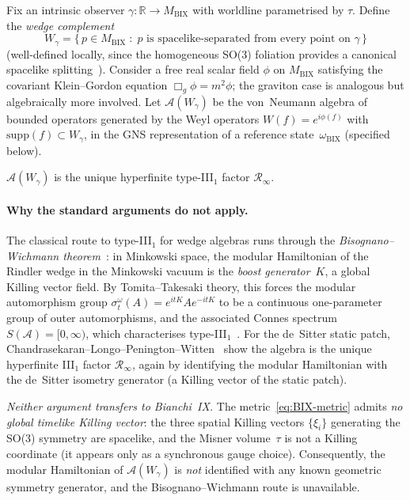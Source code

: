 Fix an intrinsic observer $\gamma:\mathbb{R}\to M_{\mathrm{BIX}}$
with worldline parametrised by $\tau$.
Define the \emph{wedge complement}
\begin{equation}
  W_\gamma = \{\,p\in M_{\mathrm{BIX}}\;:\;
     p \text{ is spacelike-separated from every point on }\gamma\,\}
\end{equation}
(well-defined locally, since the homogeneous SO(3) foliation provides a
canonical spacelike splitting~\cite{HeinzleUggla2009}).
Consider a free real scalar field $\phi$ on $M_{\mathrm{BIX}}$
satisfying the covariant Klein--Gordon equation $\Box_g\phi = m^2\phi$;
the graviton case is analogous but algebraically more involved.
Let $\mathcal{A}(W_\gamma)$ be the von~Neumann algebra of bounded
operators generated by the Weyl operators $W(f) = e^{i\phi(f)}$
with $\mathrm{supp}(f)\subset W_\gamma$, in the GNS representation
of a reference state~$\omega_{\mathrm{BIX}}$ (specified below).

\begin{conjecture}
\label{conj:wedge-type}
$\mathcal{A}(W_\gamma)$ is the unique hyperfinite type-\textrm{III}$_1$ factor
$\mathcal{R}_\infty$.
\end{conjecture}

\paragraph{Why the standard arguments do not apply.}
The classical route to type-III$_1$ for wedge algebras
runs through the \emph{Bisognano--Wichmann theorem}~\cite{BW76}:
in Minkowski space, the modular Hamiltonian of the Rindler wedge in the
Minkowski vacuum is the \emph{boost generator}~$K$, a global Killing
vector field.
By Tomita--Takesaki theory, this forces the modular automorphism
group $\sigma_t^{\omega}(A) = e^{itK}Ae^{-itK}$ to be a continuous
one-parameter group of outer automorphisms, and the associated Connes
spectrum $S(\mathcal{A}) = [0,\infty)$, which characterises
type-III$_1$~\cite{Witten2022}.
For the de~Sitter static patch,
Chandrasekaran--Longo--Penington--Witten~\cite{CLPW2022}
show the algebra is the unique hyperfinite III$_1$ factor
$\mathcal{R}_\infty$, again by identifying the
modular Hamiltonian with the de~Sitter isometry generator
(a Killing vector of the static patch).

\emph{Neither argument transfers to Bianchi~IX.}
The metric~\eqref{eq:BIX-metric} admits \emph{no global timelike Killing
vector}: the three spatial Killing vectors $\{\xi_i\}$ generating the
SO(3) symmetry are spacelike, and the Misner volume~$\tau$ is not a
Killing coordinate (it appears only as a synchronous gauge choice).
Consequently, the modular Hamiltonian of $\mathcal{A}(W_\gamma)$
is \emph{not} identified with any known geometric symmetry generator,
and the Bisognano--Wichmann route is unavailable.

